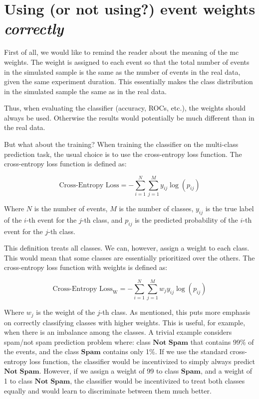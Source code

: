 \section{Using (or not using?) event weights \em{correctly}}
\label{sec:weights}

First of all, we would like to remind the reader about the meaning of the \gls{mc} weights. The weight is assigned to
each event so that the total number of events in the simulated sample is the same as the number of events in the real
data, given the same experiment duration. This essentially makes the class distribution in the simulated sample the same
as in the real data.

Thus, when evaluating the classifier (accuracy, ROCs, etc.), the weights should always be used.
Otherwise the results would potentially be much different than in the real data.

But what about the training? When training the classifier on the multi-class prediction task, the usual choice is to use
the cross-entropy loss function. The cross-entropy loss function is defined as:

$$
    \text{Cross-Entropy Loss} = -\sum_{i=1}^{N} \sum_{j=1}^{M} y_{ij} \log(p_{ij})
$$

Where $N$ is the number of events, $M$ is the number of classes, $y_{ij}$ is the true label of the $i$-th event for the
$j$-th class, and $p_{ij}$ is the predicted probability of the $i$-th event for the $j$-th class.

This definition treats all classes. We can, however, assign a weight to each class. This would mean that some classes
are essentially prioritized over the others. The cross-entropy loss function with weights is defined as:

$$
    \text{Cross-Entropy Loss}_\text{W} = -\sum_{i=1}^{N} \sum_{j=1}^{M} w_j y_{ij} \log(p_{ij})
$$

Where $w_j$ is the weight of the $j$-th class. As mentioned, this puts more emphasis on correctly classifying classes
with higher weights. This is useful, for example, when there is an imbalance among the classes. A trivial example
considers spam/not spam prediction problem where: class $\textbf{Not Spam}$ that contains 99\% of the events, and the
class $\textbf{Spam}$ contains only 1\%. If we use the standard cross-entropy loss function, the classifier would be
incentivized to simply always predict $\textbf{Not Spam}$. However, if we assign a weight of 99 to class
$\textbf{Spam}$, and a weight of 1 to class $\textbf{Not Spam}$, the classifier would be incentivized to treat both
classes equally and would learn to discriminate between them much better.

